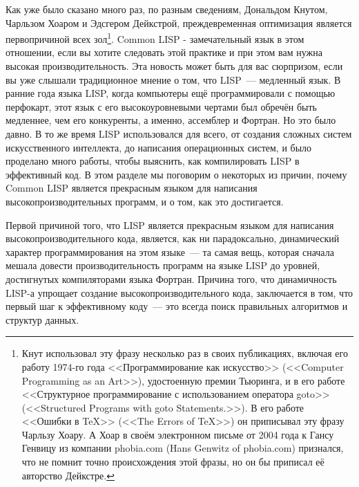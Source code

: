 Как уже было сказано много раз, по разным сведениям, Дональдом Кнутом, Чарльзом Хоаром и
Эдсгером Дейкстрой, преждевременная оптимизация является первопричиной всех
зол\footnote{Кнут использовал эту фразу несколько раз в своих публикациях, включая его
    работу 1974-го года <<Программирование как искусство>> (<<Computer Programming as an
    Art>>), удостоенную премии Тьюринга, и в его работе <<Структурное программирование с
    использованием оператора goto>> (<<Structured Programs with goto Statements.>>). В его
    работе <<Ошибки в TeX>> (<<The Errors of TeX>>) он приписывал эту фразу Чарльзу Хоару.
    А Хоар в своём электронном письме от 2004 года к Гансу Генвицу из компании phobia.com
    (Hans Genwitz of phobia.com) признался, что не помнит точно происхождения этой фразы,
    но он бы приписал её авторство Дейкстре.}. Common LISP - замечательный язык в этом
    отношении, если вы хотите следовать этой практике и при этом вам нужна высокая
    производительность. Эта новость может быть для вас сюрпризом, если вы уже слышали
    традиционное мнение о том, что LISP~--- медленный язык. В ранние года языка LISP,
    когда компьютеры ещё программировали с помощью перфокарт, этот язык с его
    высокоуровневыми чертами был обречён быть медленнее, чем его конкуренты, а именно,
    ассемблер и Фортран. Но это было давно. В то же время LISP использовался для всего, от
    создания сложных систем искусственного интеллекта, до написания операционных систем, и
    было проделано много работы, чтобы выяснить, как компилировать LISP в эффективный код.
    В этом разделе мы поговорим о некоторых из причин, почему Common LISP является
    прекрасным языком для написания высокопроизводительных программ, и о том, как это
    достигается.

Первой причиной того, что LISP является прекрасным языком для написания
высокопроизводительного кода, является, как ни парадоксально, динамический характер
программирования на этом языке~--- та самая вещь, которая сначала мешала довести
производительность программ на языке LISP до уровней, достигнутых компиляторами языка
Фортран. Причина того, что динамичность LISP-а упрощает создание высокопроизводительного
кода, заключается в том, что первый шаг к эффективному коду~--- это всегда поиск
правильных алгоритмов и структур данных.

